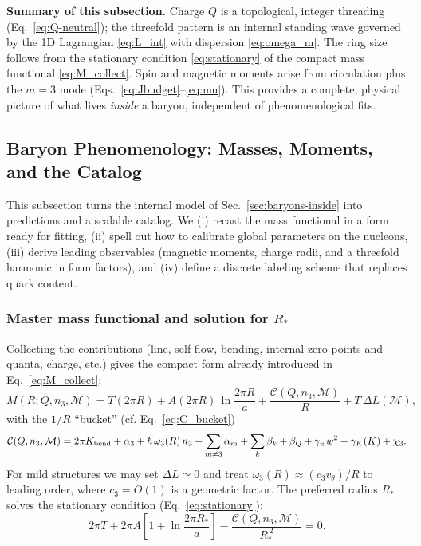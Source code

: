 \medskip
\noindent\textbf{Summary of this subsection.}
Charge $Q$ is a topological, integer threading (Eq.~\eqref{eq:Q-neutral}); the threefold pattern is an internal standing wave governed by the 1D Lagrangian \eqref{eq:L_int} with dispersion \eqref{eq:omega_m}. The ring size follows from the stationary condition \eqref{eq:stationary} of the compact mass functional \eqref{eq:M_collect}. Spin and magnetic moments arise from circulation plus the $m{=}3$ mode (Eqs.~\eqref{eq:Jbudget}--\eqref{eq:mu}). This provides a complete, physical picture of what lives \emph{inside} a baryon, independent of phenomenological fits.

\subsection{Baryon Phenomenology: Masses, Moments, and the Catalog}
\label{sec:baryons-phenomenology}

This subsection turns the internal model of Sec.~\ref{sec:baryons-inside} into predictions and a scalable catalog. We (i) recast the mass functional in a form ready for fitting, (ii) spell out how to calibrate global parameters on the nucleons, (iii) derive leading observables (magnetic moments, charge radii, and a threefold harmonic in form factors), and (iv) define a discrete labeling scheme that replaces quark content.

\subsubsection{Master mass functional and solution for $R_\ast$}
\label{sec:baryons-phenomenology:master}

Collecting the contributions (line, self-flow, bending, internal zero-points and quanta, charge, etc.) gives the compact form already introduced in Eq.~\eqref{eq:M_collect}:
\begin{equation}
M(R;Q,n_3,\mathcal M)
= T(2\pi R) + A(2\pi R)\,\ln\!\frac{2\pi R}{a} + \frac{\mathcal C(Q,n_3,\mathcal M)}{R} + T\,\Delta L(\mathcal M),
\label{eq:masterM}
\end{equation}
with the $1/R$ ``bucket'' (cf. Eq.~\eqref{eq:C_bucket})
\begin{equation}
\mathcal C(Q,n_3,\mathcal M)
= 2\pi K_{\rm bend} + \alpha_3 + \hbar\,\omega_3(R)\,n_3 + \sum_{m\neq 3}\alpha_m + \sum_{k}\beta_k + \beta_Q + \gamma_w w^2 + \gamma_K(K) + \chi_3.
\end{equation}
For mild structures we may set $\Delta L\simeq 0$ and treat $\omega_3(R)\approx (c_3 v_\theta)/R$ to leading order, where $c_3=O(1)$ is a geometric factor. The preferred radius $R_\ast$ solves the stationary condition (Eq.~\eqref{eq:stationary}):
\begin{equation}
2\pi T + 2\pi A\!\left[1+\ln\!\frac{2\pi R_\ast}{a}\right] - \frac{\mathcal C(Q,n_3,\mathcal M)}{R_\ast^{\,2}}=0.
\label{eq:Rstar-eq}
\end{equation}

